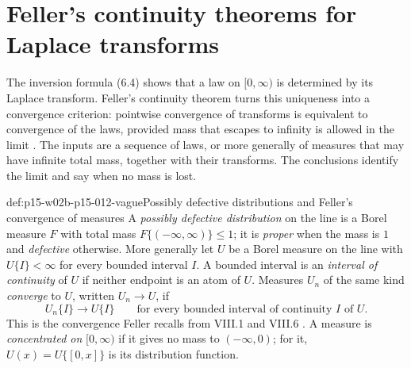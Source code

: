 \section{Feller's continuity theorems for Laplace transforms}
\label{sec:p15-w02b-p15-012-laplace-continuity}

The inversion formula (6.4) shows that a law on \([0,\infty)\) is determined
by its Laplace transform. Feller's continuity theorem turns this uniqueness
into a convergence criterion: pointwise convergence of transforms is
equivalent to convergence of the laws, provided mass that escapes to infinity
is allowed in the limit \cite[vol.~II, XIII.1, pp.~429--433]{Feller1971ProbabilityII}.
The inputs are a sequence of laws, or more generally of measures that may have
infinite total mass, together with their transforms. The conclusions identify
the limit and say when no mass is lost.

\begin{hbdefinition}{def:p15-w02b-p15-012-vague}{Possibly defective distributions and Feller's convergence of measures}
A \emph{possibly defective distribution} on the line is a Borel measure \(F\)
with total mass \(F\{(-\infty,\infty)\}\leq1\); it is \emph{proper} when the
mass is \(1\) and \emph{defective} otherwise. More generally let \(U\) be a
Borel measure on the line with \(U\{I\}<\infty\) for every bounded interval
\(I\). A bounded interval is an \emph{interval of continuity} of \(U\) if
neither endpoint is an atom of \(U\). Measures \(U_n\) of the same kind
\emph{converge} to \(U\), written \(U_n\to U\), if
\[
 U_n\{I\}\longrightarrow U\{I\}\qquad\text{for every bounded interval of continuity }I\text{ of }U .
\]
This is the convergence Feller recalls from VIII.1 and VIII.6
\cite[vol.~II, XIII.1, p.~433]{Feller1971ProbabilityII}. A measure is
\emph{concentrated on} \([0,\infty)\) if it gives no mass to \((-\infty,0)\);
for it, \(U(x)=U\{[0,x]\}\) is its distribution function.
\end{hbdefinition}

